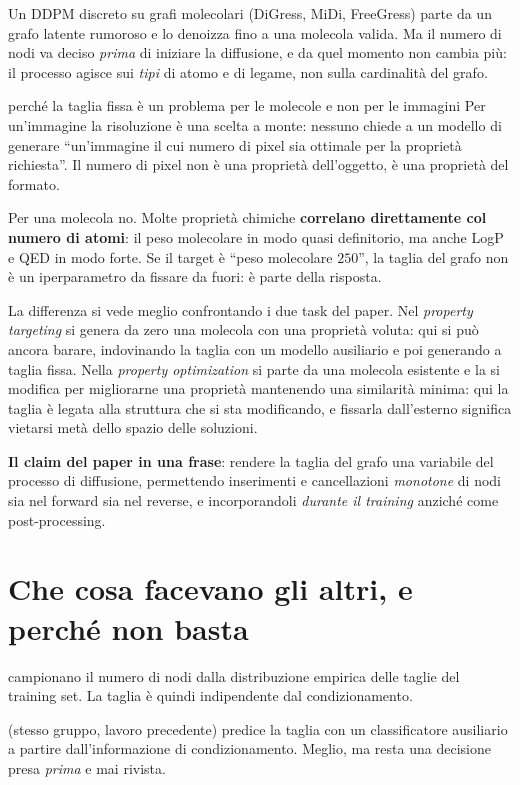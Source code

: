 Un DDPM discreto su grafi molecolari (DiGress, MiDi, FreeGress) parte da un grafo latente rumoroso e lo denoizza fino a una molecola valida. Ma il numero di nodi va deciso \emph{prima} di iniziare la diffusione, e da quel momento non cambia più: il processo agisce sui \emph{tipi} di atomo e di legame, non sulla cardinalità del grafo.

\begin{intuizione}{perché la taglia fissa è un problema per le molecole e non per le immagini}
Per un'immagine la risoluzione è una scelta a monte: nessuno chiede a un modello di generare ``un'immagine il cui numero di pixel sia ottimale per la proprietà richiesta''. Il numero di pixel non è una proprietà dell'oggetto, è una proprietà del formato.

Per una molecola no. Molte proprietà chimiche \textbf{correlano direttamente col numero di atomi}: il peso molecolare in modo quasi definitorio, ma anche LogP e QED in modo forte. Se il target è ``peso molecolare $250$'', la taglia del grafo non è un iperparametro da fissare da fuori: è parte della risposta.

La differenza si vede meglio confrontando i due task del paper. Nel \emph{property targeting} si genera da zero una molecola con una proprietà voluta: qui si può ancora barare, indovinando la taglia con un modello ausiliario e poi generando a taglia fissa. Nella \emph{property optimization} si parte da una molecola esistente e la si modifica per migliorarne una proprietà mantenendo una similarità minima: qui la taglia è legata alla struttura che si sta modificando, e fissarla dall'esterno significa vietarsi metà dello spazio delle soluzioni.

\textbf{Il claim del paper in una frase}: rendere la taglia del grafo una variabile del processo di diffusione, permettendo inserimenti e cancellazioni \emph{monotone} di nodi sia nel forward sia nel reverse, e incorporandoli \emph{durante il training} anziché come post-processing.
\end{intuizione}

\section{Che cosa facevano gli altri, e perché non basta}

\begin{description}[leftmargin=2.5em,style=nextline]
  \item[DiGress, MiDi] campionano il numero di nodi dalla distribuzione empirica delle taglie del training set. La taglia è quindi indipendente dal condizionamento.
  \item[FreeGress] (stesso gruppo, lavoro precedente) predice la taglia con un classificatore ausiliario a partire dall'informazione di condizionamento. Meglio, ma resta una decisione presa \emph{prima} e mai rivista.
\end{description}

